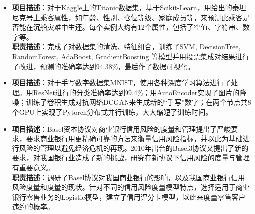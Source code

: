 \documentclass{resume}
\begin{document}
\begin{itemize}

\item {}
\textbf{项目描述}：对于Kaggle上的Titanic数据集，基于Scikit-Learn，用给出的泰坦尼克号上乘客属性，如年龄、性别、仓位等级、家庭成员等，来预测此乘客是否能在沉船灾难中生还。每个实例大约有12个属性，包括了空值、字符串、数字等。\\
\textbf{职责描述}：完成了对数据集的清洗、特征组合，训练了SVM, DecisionTree, RandomForest, AdaBoost, GradientBoosting 等模型并用投票集成对结果进行了改进，预测的准确率达到94.38\%，最后作了数据可视化。

\item {}
\textbf{项目描述}：对于手写数字数据集MNIST，使用各种深度学习算法进行了处理。用ResNet进行的分类准确率达到99.4\%；用AutoEncoder实现了图片的降噪；训练了卷积生成对抗网络DCGAN来生成新的“手写”数字；在两个节点共8个GPU上实现了Pytorch分布式并行训练，大大缩短了训练时间。

\item {}
\textbf{项目描述}：Basel资本协议对商业银行信用风险的度量和管理提出了严峻要求，要求商业银行用更精确可靠的方法来衡量信用风险指标，并以此为基础进行风险的管理以避免经济危机的再现。2010年出台的Basel3协议又提出了新的要求，对我国银行业造成了新的挑战，研究在新协议下信用风险的度量与管理有重要意义。\\
\textbf{职责描述}：调研了Basel协议对我国商业银行的影响，以及我国商业银行信用风险度量和度量的现状。针对不同的信用风险度量模型特点，选择适用于商业银行零售业务的Logistic模型，建立了信用评分卡模型，以此来度量零售客户违约的概率。
\end{itemize}
\end{document}
